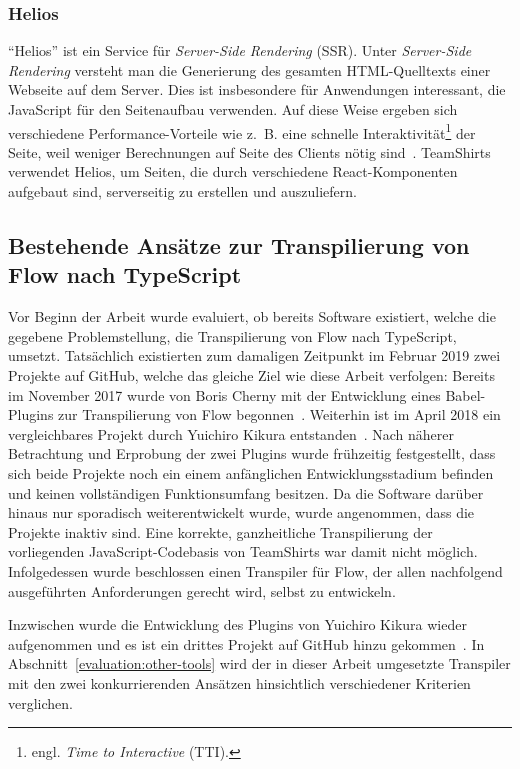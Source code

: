 \subsubsection{Helios}

\enquote{Helios} ist ein Service für \emph{Server-Side Rendering} (SSR). Unter \emph{Server-Side Rendering} versteht man die Generierung des gesamten HTML-Quelltexts einer Webseite auf dem Server. Dies ist insbesondere für Anwendungen interessant, die JavaScript für den Seitenaufbau verwenden. Auf diese Weise ergeben sich verschiedene Performance-Vorteile wie z.~B. eine schnelle Interaktivität\footnote{engl. \emph{Time to Interactive} (TTI).} der Seite, weil weniger Berechnungen auf Seite des Clients nötig sind~\autocite{GOOGLE:RENDERING_ON_THE_WEB}. TeamShirts verwendet Helios, um Seiten, die durch verschiedene React-Komponenten aufgebaut sind, serverseitig zu erstellen und auszuliefern.

\subsection{Bestehende Ansätze zur Transpilierung von Flow nach TypeScript}

Vor Beginn der Arbeit wurde evaluiert, ob bereits Software existiert, welche die gegebene Problemstellung, die Transpilierung von Flow nach TypeScript, umsetzt. Tatsächlich existierten zum damaligen Zeitpunkt im Februar 2019 zwei Projekte auf GitHub, welche das gleiche Ziel wie diese Arbeit verfolgen: Bereits im November 2017 wurde von Boris Cherny mit der Entwicklung eines Babel-Plugins zur Transpilierung von Flow begonnen~\autocite{CHERNY:FLOW_TO_TS}. Weiterhin ist im April 2018 ein vergleichbares Projekt durch Yuichiro Kikura entstanden~\autocite{KIKURA:FLOW_TO_TS}. Nach näherer Betrachtung und Erprobung der zwei Plugins wurde frühzeitig festgestellt, dass sich beide Projekte noch ein einem anfänglichen Entwicklungsstadium befinden und keinen vollständigen Funktionsumfang besitzen. Da die Software darüber hinaus nur sporadisch weiterentwickelt wurde, wurde angenommen, dass die Projekte inaktiv sind. Eine korrekte, ganzheitliche Transpilierung der vorliegenden JavaScript-Codebasis von TeamShirts war damit nicht möglich. Infolgedessen wurde beschlossen einen Transpiler für Flow, der allen nachfolgend ausgeführten Anforderungen gerecht wird, selbst zu entwickeln.

Inzwischen wurde die Entwicklung des Plugins von Yuichiro Kikura wieder aufgenommen und es ist ein drittes Projekt auf GitHub hinzu gekommen~\autocite{KHAN:FLOW_TO_TS}. In Abschnitt~\ref{evaluation:other-tools} wird der in dieser Arbeit umgesetzte Transpiler mit den zwei konkurrierenden Ansätzen hinsichtlich verschiedener Kriterien verglichen.

